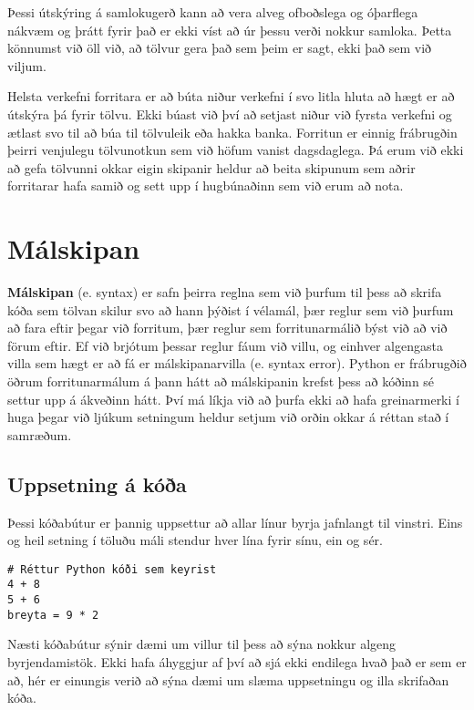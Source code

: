 Þessi útskýring á samlokugerð kann að vera alveg ofboðslega og óþarflega nákvæm og þrátt fyrir það er ekki víst að úr þessu verði nokkur samloka.
Þetta könnumst við öll við, að tölvur gera það sem þeim er sagt, ekki það sem við viljum.

Helsta verkefni forritara er að búta niður verkefni í svo litla hluta að hægt er að útskýra þá fyrir tölvu.
Ekki búast við því að setjast niður við fyrsta verkefni og ætlast svo til að búa til tölvuleik eða hakka banka.
Forritun er einnig frábrugðin þeirri venjulegu tölvunotkun sem við höfum vanist dagsdaglega.
Þá erum við ekki að gefa tölvunni okkar eigin skipanir heldur að beita skipunum sem aðrir forritarar hafa samið og sett upp í hugbúnaðinn sem við erum að nota.


\section{Málskipan}

\textbf{Málskipan} (e. syntax) er safn þeirra reglna sem við þurfum til þess að skrifa kóða sem tölvan skilur svo að hann þýðist í vélamál, þær reglur sem við þurfum að fara eftir þegar við forritum, þær reglur sem forritunarmálið býst við að við förum eftir. 
Ef við brjótum þessar reglur fáum við villu, og einhver algengasta villa sem hægt er að fá er málskipanarvilla (e. syntax error). 
Python er frábrugðið öðrum forritunarmálum á þann hátt að málskipanin krefst þess að kóðinn sé settur upp á ákveðinn hátt. 
Því má líkja við að þurfa ekki að hafa greinarmerki í huga þegar við ljúkum setningum heldur setjum við orðin okkar á réttan stað í samræðum.

\subsection{Uppsetning á kóða}
Þessi kóðabútur er þannig uppsettur að allar línur byrja jafnlangt til vinstri.
Eins og heil setning í töluðu máli stendur hver lína fyrir sínu, ein og sér.
\begin{lstlisting}[caption=Réttur Python kóði, label=lst:inng-kóðadæmi]
# Réttur Python kóði sem keyrist
4 + 8
5 + 6
breyta = 9 * 2
\end{lstlisting}

Næsti kóðabútur sýnir dæmi um villur til þess að sýna nokkur algeng byrjendamistök.
Ekki hafa áhyggjur af því að sjá ekki endilega hvað það er sem er að, hér er einungis verið að sýna dæmi um slæma uppsetningu og illa skrifaðan kóða.

